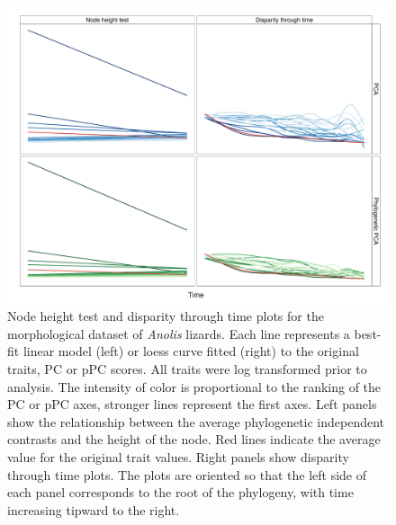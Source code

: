 \documentclass[a4paper,11pt]{article}
\begin{document}
\begin{figure}[p]
\centering
\includegraphics[scale=0.65]{./fig/anoles_nh-dtt.pdf}
\caption{Node height test and disparity through time plots for the morphological dataset of \textit{Anolis} lizards. Each line represents a best-fit linear model (left) or loess curve fitted (right) to the original traits, PC or pPC scores. All traits were log transformed prior to analysis. The intensity of color is proportional to the ranking of the PC or pPC axes, stronger lines represent the first axes. Left panels show the relationship between the average phylogenetic independent contrasts and the height of the node. Red lines indicate the average value for the original trait values. Right panels show disparity through time plots. The plots are oriented so that the left side of each panel corresponds to the root of the phylogeny, with time increasing tipward to the right. }
\label{anoles_nh}
\end{figure}
\end{document}
